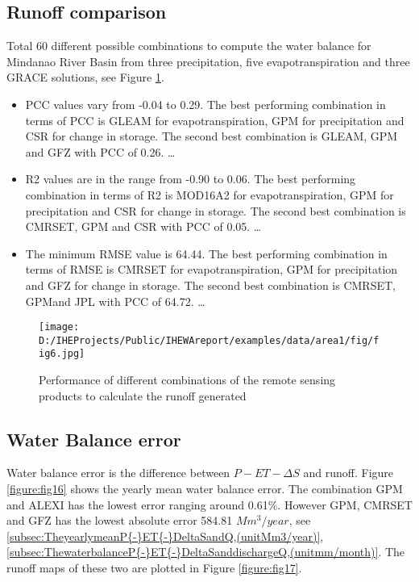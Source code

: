 \documentclass[oneside,openany]{article}%
\begin{document}
\subsection{Runoff comparison}%
\label{subsec:Runoffcomparison}%
Total 60 different possible combinations to compute the water balance for Mindanao River Basin from three precipitation, five evapotranspiration and three GRACE solutions, see Figure \ref{figure:fig15}.%
\linebreak%
\begin{itemize}%
\item%
PCC values vary from {-}0.04 to 0.29. The best performing combination in terms of PCC is GLEAM for evapotranspiration, GPM for precipitation and CSR for change in storage. The second best combination is GLEAM, GPM and GFZ with PCC of 0.26.%
\ldots%
\item%
R2 values are in the range from {-}0.90 to 0.06. The best performing combination in terms of R2 is MOD16A2 for evapotranspiration, GPM for precipitation and CSR for change in storage. The second best combination is CMRSET, GPM and CSR with PCC of 0.05.%
\ldots%
\item%
The minimum RMSE value is 64.44. The best performing combination in terms of RMSE is CMRSET for evapotranspiration, GPM for precipitation and GFZ for change in storage. The second best combination is CMRSET, GPMand JPL with PCC of 64.72.%
\ldots%
\end{itemize}%


\begin{figure}[H]%
\centering%
\texttt{[image: D:/IHEProjects/Public/IHEWAreport/examples/data/area1/fig/fig6.jpg]}%
\caption{Performance of different combinations of the remote sensing products to calculate the runoff generated}%
\label{figure:fig15}%
\end{figure}

%
\subsection{Water Balance error}%
\label{subsec:WaterBalanceerror}%
Water balance error is the difference between $P-ET-\Delta S$ and runoff. Figure \ref{figure:fig16} shows the yearly mean water balance error. The combination GPM and ALEXI has the lowest error ranging around 0.61\%. However GPM, CMRSET and GFZ has the lowest absolute error 584.81 $Mm^3/year$, see \ref{subsec:TheyearlymeanP{-}ET{-}DeltaSandQ,(unitMm3/year)}, \ref{subsec:ThewaterbalanceP{-}ET{-}DeltaSanddischargeQ,(unitmm/month)}. The runoff maps of these two are plotted in Figure \ref{figure:fig17}.%
\linebreak%
\end{document}
